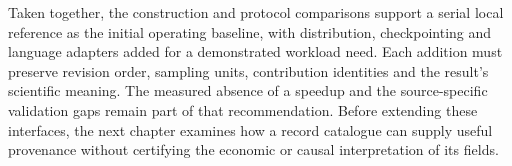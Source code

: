 Taken together, the construction and protocol comparisons support a serial local reference as the initial operating baseline, with distribution, checkpointing and language adapters added for a demonstrated workload need. Each addition must preserve revision order, sampling units, contribution identities and the result's scientific meaning. The measured absence of a speedup and the source-specific validation gaps remain part of that recommendation. Before extending these interfaces, the next chapter examines how a record catalogue can supply useful provenance without certifying the economic or causal interpretation of its fields.

